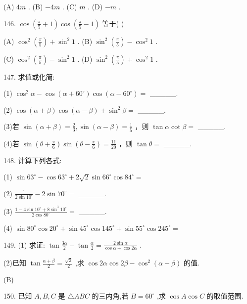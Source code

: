 \documentclass[10pt]{article}
\begin{document}
(A) \({4m}\) . (B) \(- {4m}\) . (C) \(m\) . (D) \(- m\) .

146. \(\cos \left( {\frac{\pi }{5} + 1}\right) \cos \left( {\frac{\pi }{5} - 1}\right)\) 等于( )

(A) \({\cos }^{2}\left( \frac{\pi }{5}\right)  + {\sin }^{2}1\) . (B) \({\sin }^{2}\left( \frac{\pi }{5}\right)  - {\cos }^{2}1\) .

(C) \({\cos }^{2}\left( \frac{\pi }{5}\right)  - {\sin }^{2}1\) . (D) \({\sin }^{2}\left( \frac{\pi }{5}\right)  + {\cos }^{2}1\) .

147. 求值或化简:

(1) \({\cos }^{2}\alpha  - \cos \left( {\alpha  + {60}^{ \circ  }}\right) \cos \left( {\alpha  - {60}^{ \circ  }}\right)  =\) \_\_\_\_\_.

(2) \(\cos \left( {\alpha  + \beta }\right) \cos \left( {\alpha  - \beta }\right)  + {\sin }^{2}\beta  =\) \_\_\_\_\_.

(3)若 \(\sin \left( {\alpha  + \beta }\right)  = \frac{2}{3},\sin \left( {\alpha  - \beta }\right)  = \frac{1}{5}\) ，则 \(\tan \alpha \cot \beta  =\) \_\_\_\_\_.

(4)若 \(\sin \left( {\theta  + \frac{\pi }{6}}\right) \sin \left( {\theta  - \frac{\pi }{6}}\right)  = \frac{11}{20}\) ，则 \(\tan \theta  =\) \_\_\_\_\_.

148. 计算下列各式:

(1) \(\sin {63}^{ \circ  } - \cos {63}^{ \circ  } + 2\sqrt{2}\sin {66}^{ \circ  }\cos {84}^{ \circ  } =\)

(2) \(\frac{1}{2\sin {10}^{ \circ  }} - 2\sin {70}^{ \circ  } =\) \_\_\_\_\_.

(3) \(\frac{1 - 4\sin {10}^{ \circ  } + 8{\sin }^{3}{10}^{ \circ  }}{2\cos {80}^{ \circ  }} =\) \_\_\_\_\_.

(4) \(\sin {80}^{ \circ  }\cos {20}^{ \circ  } + \sin {45}^{ \circ  }\cos {145}^{ \circ  } + \sin {55}^{ \circ  }\cos {245}^{ \circ  } =\)

149. (1) 求证: \(\tan \frac{3\alpha }{2} - \tan \frac{\alpha }{2} = \frac{2\sin \alpha }{\cos \alpha  + \cos {2\alpha }}\) .

(2)已知 \(\tan \frac{\alpha  + \beta }{2} = \frac{\sqrt{2}}{2}\) ,求 \(\cos {2\alpha }\cos {2\beta } - {\cos }^{2}\left( {\alpha  - \beta }\right)\) 的值.

(B)

150. 已知 \(A,B,C\) 是 \(\bigtriangleup {ABC}\) 的三内角,若 \(B = {60}^{ \circ  }\) ,求 \(\cos A\cos C\) 的取值范围.
\end{document}
